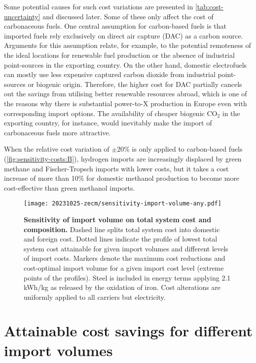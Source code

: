 Some potential causes for such cost variations are presented in
\cref{tab:cost-uncertainty} and discussed later. Some of these only affect the
cost of carbonaceous fuels. One central assumption for carbon-based fuels is
that imported fuels rely exclusively on direct air capture (DAC) as a carbon
source. Arguments for this assumption relate, for example, to the potential
remoteness of the ideal locations for renewable fuel production or the absence
of industrial point-sources in the exporting country. On the other hand,
domestic electrofuels can mostly use less expensive captured carbon dioxide from
industrial point-sources or biogenic origin. Therefore, the higher cost for DAC
partially cancels out the savings from utilising better renewable resources
abroad, which is one of the reasons why there is substantial power-to-X
production in Europe even with corresponding import options. The availability of
cheaper biogenic CO$_2$ in the exporting country, for instance, would inevitably
make the import of carbonaceous fuels more attractive.

When the relative cost variation of $\pm 20\%$ is only applied to carbon-based
fuels (\cref{fig:sensitivity-costs:B}), hydrogen imports are increasingly
displaced by green methane and Fischer-Tropsch imports with lower costs, but it
takes a cost increase of more than 10\% for domestic methanol production to
become more cost-effective than green methanol imports. 


\begin{figure*}
    \texttt{[image: 20231025-zecm/sensitivity-import-volume-any.pdf]}
    \caption{\textbf{Sensitivity of import volume on total system cost and composition.} 
        Dashed line splits total system cost into domestic and foreign cost.
        Dotted lines indicate the profile of lowest total system cost attainable for given import volumes and different levels of import costs.
        Markers denote the maximum cost reductions and cost-optimal import volume for a given import cost level (extreme points of the profiles).
        Steel is included in energy terms applying 2.1 kWh/kg as released by the oxidation of iron.
        Cost alterations are uniformly applied to all carriers but electricity.
    }
    \label{fig:sensitivity-volume}
\end{figure*}

\section*{Attainable cost savings for different import volumes}

